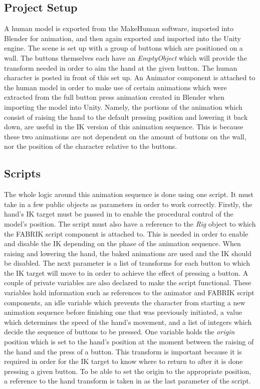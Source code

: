 \subsection{Project Setup}
A human model is exported from the MakeHuman software, imported into Blender for
animation, and then again exported and imported into the Unity engine. The scene
is set up with a group of buttons which are positioned on a wall. The buttons
themselves each have an \textit{EmptyObject} which will provide the transform
needed in order to aim the hand at the given button. The human character is
posted in front of this set up. An Animator component is attached to the human
model in order to make use of certain animations which were extracted from the
full button press animation created in Blender when importing the model into
Unity. Namely, the portions of the animation which consist of raising the hand
to the default pressing position and lowering it back down, are useful in the IK
version of this animation sequence. This is because these two animations are not
dependent on the amount of buttons on the wall, nor the position of the
character relative to the buttons.
\subsection{Scripts}
The whole logic around this animation sequence is done using one script. It must
take in a few public objects as parameters in order to work correctly. Firstly,
the hand's IK target must be passed in to enable the procedural control of the
model's position. The script must also have a reference to the \textit{Rig}
object to which the FABRIK script component is attached to. This is needed in
order to enable and disable the IK depending on the phase of the animation
sequence. When raising and lowering the hand, the baked animations are used and
the IK should be disabled. The next parameter is a list of transforms for each
button to which the IK target will move to in order to achieve the effect of
pressing a button. A couple of private variables are also declared to make the
script functional. These variables hold information such as references to the
animator and FABRIK script components, an idle variable which prevents the
character from starting a new animation sequence before finishing one that was
previously initiated, a value which determines the speed of the hand's movement,
and a list of integers which decide the sequence of buttons to be pressed. One
variable holds the \textit{origin} position which is set to the hand's
position at the moment between the raising of the hand and the press of
a button. This transform is important because it is required in order for the IK
target to know where to return to after it is done pressing a given button. To
be able to set the origin to the appropriate position, a reference to the hand
transform is taken in as the last parameter of the script.

